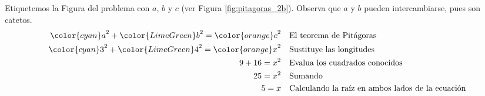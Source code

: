 \begin{solutionbox}{11cm}
\begin{minipage}{0.65\textwidth}
        Etiquetemos la Figura del problema con $a$, $b$ y $c$ (ver Figura \ref{fig:pitagoras_2b}).
        Observa que $a$ y $b$ pueden intercambiarse, pues son catetos.
        \begin{align*}
            {\color{cyan}a}^2+{\color{LimeGreen}b}^2  ={\color{orange}c}^2 & \text{\quad El teorema de Pitágoras}                          \\
            {\color{cyan}3}^2+{\color{LimeGreen}4}^2  ={\color{orange}x}^2 & \text{\quad Sustituye las longitudes}                         \\
            9+16  =x^2                                                     & \text{\quad Evalua los cuadrados conocidos}                   \\
            25=x^2                                                         & \text{\quad Sumando }                                         \\
            5=x                                                            & \text{\quad Calculando la raíz en ambos lados de la ecuación} \\
        \end{align*}
    \end{minipage}
\end{solutionbox}
